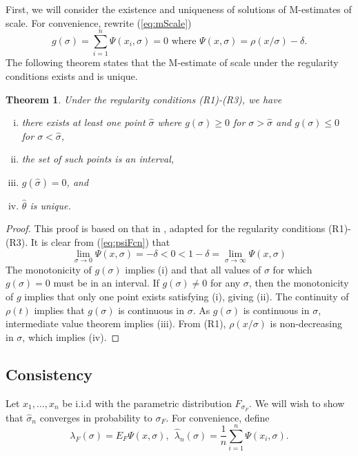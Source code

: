 First, we will consider the existence and uniqueness of solutions of M-estimates of scale. For convenience, rewrite (\ref{eq:mScale})
\begin{equation}
\label{eq:psiFcn}
    g(\sigma) = \sum_{i=1}^n \Psi(x_i,\sigma) = 0 \text{  where  }\Psi(x,\sigma) = \rho(x/\sigma) - \delta.
\end{equation}
The following theorem states that the M-estimate of scale under the regularity conditions exists and is unique.
\newtheorem{thm}{Theorem}[section]
\begin{thm}
\label{thm:mEstExUn}
Under the regularity conditions (R1)-(R3), we have
\vspace{-3mm}
\begin{enumerate}[(i)]
    \item there exists at least one point $\hat\sigma$ where $g(\sigma)\geq 0$ for $\sigma > \hat\sigma$ and $g(\sigma)\leq 0$ for $\sigma < \hat\sigma$,
    \item  the set of such points is an interval,
     \item $g(\hat\sigma) = 0$, and
     \item $\hat\theta$ is unique.
\end{enumerate}
\end{thm}
\begin{proof}[Proof]
This proof is based on that in \cite{maronna2019robust}, adapted for the regularity conditions (R1)-(R3). It is clear from (\ref{eq:psiFcn}) that
$$ \lim_{\sigma \xrightarrow{} 0} \Psi(x,\sigma) = -\delta < 0 < 1-\delta =  \lim_{\sigma \xrightarrow{} \infty} \Psi(x,\sigma) $$
The monotonicity of $g(\sigma)$ implies (i) and that all values of $\sigma$ for which $g(\sigma) = 0$ must be in an interval. If $g(\sigma) \not= 0$ for any $\sigma$, then the monotonicity of $g$ implies that only one point exists satisfying (i), giving (ii). The continuity of $\rho(t)$ implies that $g(\sigma)$ is continuous in $\sigma$. As $g(\sigma)$ is continuous in $\sigma$, intermediate value theorem implies (iii). From (R1), $\rho(x/\sigma)$ is non-decreasing in $\sigma$, which implies (iv).
\end{proof}

\subsection{Consistency}

Let $x_1,\hdots,x_n$ be i.i.d with the parametric distribution $F_{\sigma_F}$. We will wish to show that $\hat\sigma_n$ converges in probability to $\sigma_F$. For convenience, define
\begin{equation}
\label{eq:lambdaFcn}
    \lambda_F(\sigma) = E_F \Psi(x,\sigma),\ \ 
    \hat\lambda_n(\sigma) = \frac{1}{n}\sum_{i=1}^n\Psi(x_i,\sigma).
\end{equation}

